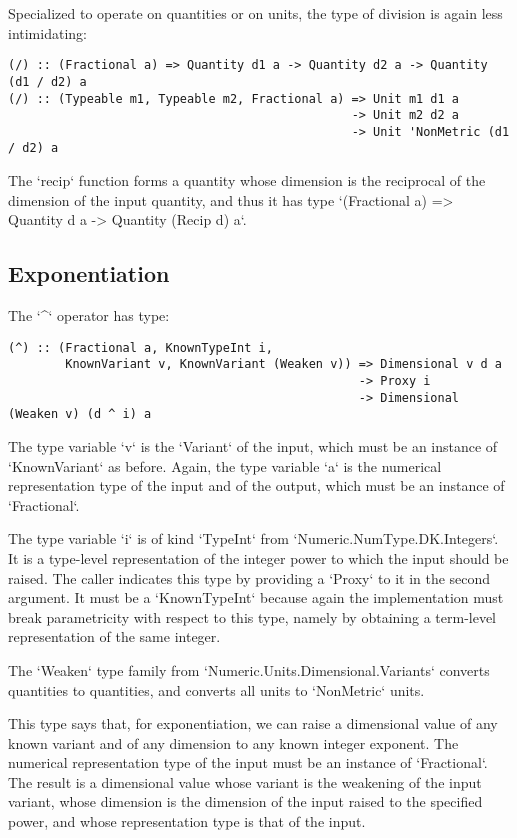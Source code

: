 \documentclass[11pt]{report}
\begin{document}
Specialized to operate on quantities or on units, the type of division is again less intimidating:

\begin{lstlisting}
(/) :: (Fractional a) => Quantity d1 a -> Quantity d2 a -> Quantity (d1 / d2) a
(/) :: (Typeable m1, Typeable m2, Fractional a) => Unit m1 d1 a
                                                -> Unit m2 d2 a
                                                -> Unit 'NonMetric (d1 / d2) a
\end{lstlisting}

The `recip` function forms a quantity whose dimension is the reciprocal of the dimension of the input quantity, and thus it has type
`(Fractional a) => Quantity d a -> Quantity (Recip d) a`.

\subsection{Exponentiation}

The `^` operator has type:

\begin{lstlisting}
(^) :: (Fractional a, KnownTypeInt i,
        KnownVariant v, KnownVariant (Weaken v)) => Dimensional v d a
                                                 -> Proxy i
                                                 -> Dimensional (Weaken v) (d ^ i) a
\end{lstlisting}

The type variable `v` is the `Variant` of the input, which must be an instance of `KnownVariant` as before. Again, the type variable `a` is
the numerical representation type of the input and of the output, which must be an instance of `Fractional`.

The type variable `i` is of kind `TypeInt` from `Numeric.NumType.DK.Integers`. It is a type-level representation of the integer power to which
the input should be raised. The caller indicates this type by providing a `Proxy` to it in the second argument. It must be a `KnownTypeInt` because
again the implementation must break parametricity with respect to this type, namely by obtaining a term-level representation of the same integer.

The `Weaken` type family from `Numeric.Units.Dimensional.Variants` converts quantities to quantities, and converts all units to `NonMetric` units.

This type says that, for exponentiation, we can raise a dimensional value of any known variant and of any dimension to any known integer exponent.
The numerical representation type of the input must be an instance of `Fractional`. The result is a dimensional value whose variant is the weakening
of the input variant, whose dimension is the dimension of the input raised to the specified power, and whose representation type is that of the input.
\end{document}
